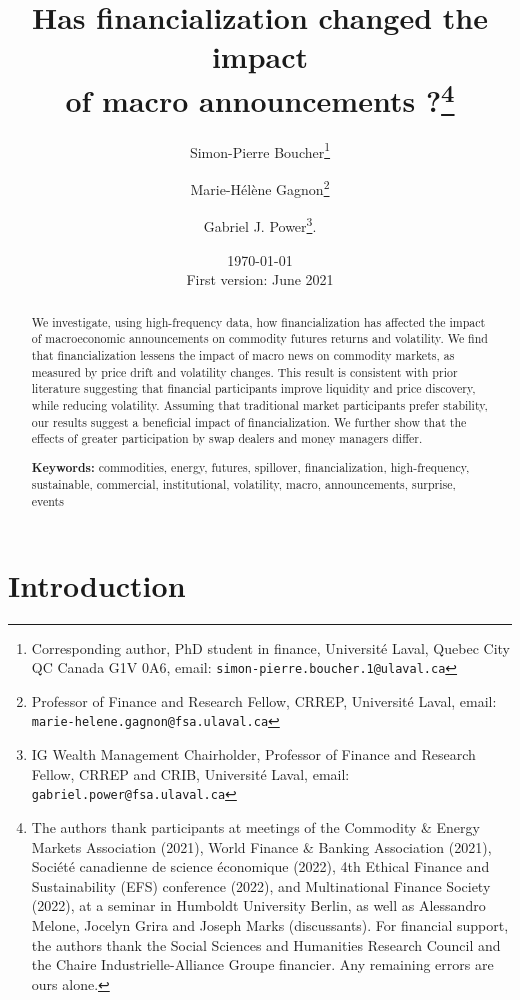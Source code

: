 \documentclass[12pt]{article}
\title{\textbf{Has financialization changed the impact\\ of macro announcements ?}\thanks{The authors thank participants at meetings of the Commodity \& Energy Markets Association (2021),  World Finance \& Banking Association (2021), Société canadienne de science  économique (2022), 4th Ethical Finance and Sustainability (EFS) conference (2022), and Multinational Finance Society (2022), at a seminar in Humboldt University Berlin, as well as Alessandro Melone, Jocelyn Grira and Joseph Marks (discussants). For financial support, the authors thank the Social Sciences and Humanities Research Council and the Chaire Industrielle-Alliance Groupe financier. Any remaining errors are ours alone.}}
\author{Simon-Pierre Boucher\footnote{Corresponding author, PhD student in finance, Université Laval, Quebec City QC Canada G1V 0A6, email:   \texttt{simon-pierre.boucher.1@ulaval.ca}}\and Marie-H{\'e}l{\`e}ne Gagnon\footnote{Professor of Finance and Research Fellow, CRREP, Université Laval, email: \texttt{marie-helene.gagnon@fsa.ulaval.ca}}\and Gabriel J. Power\footnote{IG Wealth Management Chairholder, Professor of Finance and Research Fellow, CRREP and CRIB, Université Laval, email:   \texttt{gabriel.power@fsa.ulaval.ca}}. 
}
\date{ \today \\ First version: June 2021}
\begin{document}
\begin{titlepage}
\maketitle





\begin{abstract}
\noindent 
\singlespacing
 We investigate, using high-frequency data, how financialization has affected the impact of macroeconomic announcements on commodity futures returns and volatility. We find that financialization lessens the impact of macro news on commodity markets, as measured by price drift and volatility changes. This result is consistent with prior literature suggesting that financial participants improve liquidity and price discovery, while reducing volatility. Assuming that traditional market participants prefer stability, our results suggest a beneficial impact of financialization. We further show that the effects of greater participation by swap dealers and money managers differ.%

\vspace{0.2in}
\noindent\textbf{Keywords:} commodities, energy, futures,  spillover, financialization, high-frequency, sustainable, commercial, institutional, volatility, macro, announcements, surprise, events\\


\bigskip
\end{abstract}
\setcounter{page}{0}
\thispagestyle{empty}
\end{titlepage}
\pagebreak \newpage




\doublespacing

\section{Introduction} \label{sec:introduction}
\end{document}
